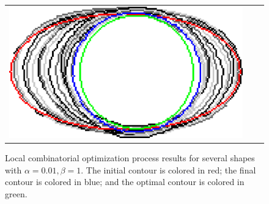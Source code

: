 \begin{figure}[hp!]
\begin{tabular}{ccc}
	\includegraphics[scale=0.25]{figures/chapter5/flow/ellipse/radius_5/ii/elastica/len_pen_0.01000/jonctions_1/curve_segs_4/best/gs_0.25000/summary.pdf}				
\end{tabular}
		\caption{Local combinatorial optimization process results for several shapes with $\alpha=0.01,\beta=1$. The initial contour is colored in red; the final contour is colored in blue; and the optimal contour is colored in green.}	
		\label{fig:local-comb-ii5-results}
\end{figure}

